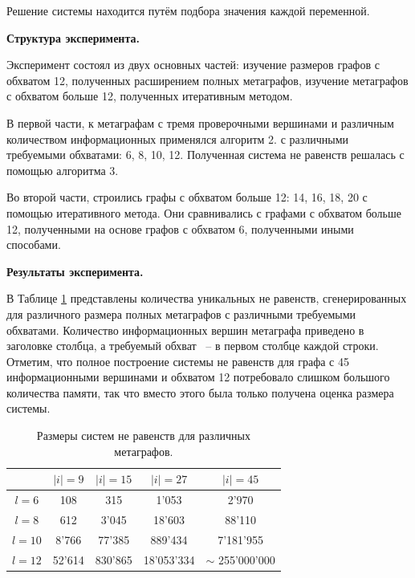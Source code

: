 \documentclass[14pt]{mmcs-article}
\begin{document}
Решение системы находится путём подбора значения каждой переменной.

\textbf{Структура эксперимента.} 

Эксперимент состоял из двух основных частей: изучение размеров графов с обхватом 12, полученных расширением полных метаграфов, изучение метаграфов с обхватом больше 12, полученных итеративным методом.

В первой части, к метаграфам с тремя проверочными вершинами и различным количеством информационных применялся алгоритм 2. с различными требуемыми обхватами: 6, 8, 10, 12. Полученная система не равенств решалась с помощью алгоритма 3.

Во второй части, строились графы с обхватом больше 12: 14, 16, 18, 20 с помощью итеративного метода. Они сравнивались с графами с обхватом больше 12, полученными на основе графов с обхватом 6, полученными иными способами.  

\textbf{Результаты эксперимента.}

В Таблице \ref{experiment_label_count_table} представлены количества уникальных не равенств, сгенерированных для различного размера полных метаграфов с различными требуемыми обхватами. Количество информационных вершин метаграфа приведено в заголовке столбца, а требуемый обхват ~-- в первом столбце каждой строки. Отметим, что полное построение системы не равенств для графа с 45 информационными вершинами и обхватом 12  потребовало слишком большого количества памяти, так что вместо этого была только получена оценка размера системы.

\begin{table}[H]
    \centering
    \begin{tabular}{ | c | c | c | c | c | }
        \hline
                   & $|i| = 9$         & $|i| = 15$        & $|i| = 27$      & $|i| = 45$   \\ \hline
        $ l = 6 $  & 108               & 315               & 1'053           & 2'970        \\ \hline
        $ l = 8 $  & 612               & 3'045             & 18'603          & 88'110       \\ \hline
        $ l = 10 $ & 8'766             & 77'385            & 889'434         & 7'181'955    \\ \hline
        $ l = 12 $ & 52'614            & 830'865           & 18'053'334      & $\sim$ 255'000'000 \\ \hline
    \end{tabular}
    \caption{ Размеры систем не равенств для различных метаграфов. }
    \label{experiment_label_count_table}
\end{table}
\end{document}
